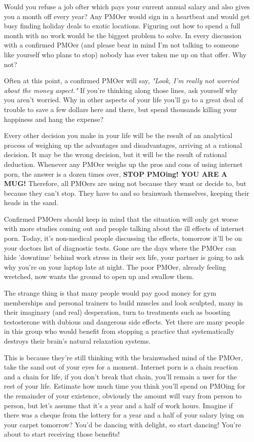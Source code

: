 \documentclass[easypeasy.tex]{subfiles}
\begin{document}
Would you refuse a job ofter which pays your current annual salary and also gives you a month off every year? Any PMOer would sign in a heartbeat and would get busy finding holiday deals to exotic locations. Figuring out how to spend a full month with no work would be the biggest problem to solve. In every discussion with a confirmed PMOer (and please bear in mind I'm not talking to someone like yourself who plans to stop) nobody has ever taken me up on that offer. Why not?

Often at this point, a confirmed PMOer will say, \textit{"Look, I'm really not worried about the money aspect."} If you're thinking along those lines, ask yourself why you aren't worried. Why in other aspects of your life you'll go to a great deal of trouble to save a few dollars here and there, but spend thousands killing your happiness and hang the expense?

Every other decision you make in your life will be the result of an analytical process of weighing up the advantages and disadvantages, arriving at a rational decision. It may be the wrong decision, but it will be the result of rational deduction. Whenever any PMOer weighs up the pros and cons of using internet porn, the answer is a dozen times over, \textbf{STOP PMOing! YOU ARE A MUG!} Therefore, all PMOers are using not because they want or decide to, but because they can't stop. They have to and so brainwash themselves, keeping their heads in the sand.

Confirmed PMOers should keep in mind that the situation will only get worse with more studies coming out and people talking about the ill effects of internet porn. Today, it's non-medical people discussing the effects, tomorrow it'll be on your doctors list of diagnostic tests. Gone are the days where the PMOer can hide 'downtime' behind work stress in their sex life, your partner is going to ask why you're on your laptop late at night. The poor PMOer, already feeling wretched, now wants the ground to open up and swallow them.

The strange thing is that many people would pay good money for gym memberships and personal trainers to build muscles and look sculpted, many in their imaginary (and real) desperation, turn to treatments such as boosting testosterone with dubious and dangerous side effects. Yet there are many people in this group who would benefit from stopping a practice that systematically destroys their brain's natural relaxation systems.

This is because they're still thinking with the brainwashed mind of the PMOer, take the sand out of your eyes for a moment. Internet porn is a chain reaction and a chain for life, if you don't break that chain, you'll remain a user for the rest of your life. Estimate how much time you think you'll spend on PMOing for the remainder of your existence, obviously the amount will vary from person to person, but let's assume that it's a year and a half of work hours. Imagine if there was a cheque from the lottery for a year and a half of your salary lying on your carpet tomorrow? You'd be dancing with delight, so start dancing! You're about to start receiving those benefits!
\end{document}
